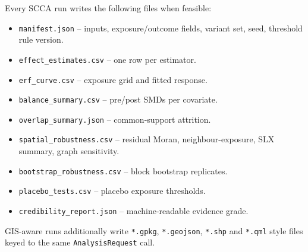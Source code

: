 \documentclass{article}
\begin{document}
Every SCCA run writes the following files when feasible:

\begin{itemize}
\item \texttt{manifest.json} -- inputs, exposure/outcome fields,
      variant set, seed, threshold rule version.
\item \texttt{effect\_estimates.csv} -- one row per estimator.
\item \texttt{erf\_curve.csv} -- exposure grid and fitted response.
\item \texttt{balance\_summary.csv} -- pre/post SMDs per covariate.
\item \texttt{overlap\_summary.json} -- common-support attrition.
\item \texttt{spatial\_robustness.csv} -- residual Moran, neighbour-exposure,
      SLX summary, graph sensitivity.
\item \texttt{bootstrap\_robustness.csv} -- block bootstrap replicates.
\item \texttt{placebo\_tests.csv} -- placebo exposure thresholds.
\item \texttt{credibility\_report.json} -- machine-readable evidence grade.
\end{itemize}

GIS-aware runs additionally write
\texttt{*.gpkg}, \texttt{*.geojson},
\texttt{*.shp} and \texttt{*.qml} style files keyed to the same
\texttt{AnalysisRequest} call.
\end{document}
